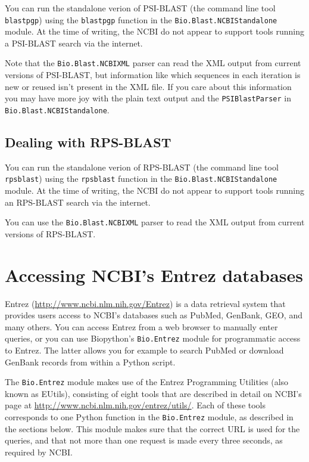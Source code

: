 \documentclass{report}
\begin{document}
You can run the standalone verion of PSI-BLAST (the command line tool
\verb|blastpgp|) using the \verb|blastpgp| function in the
\verb|Bio.Blast.NCBIStandalone| module.
At the time of writing, the NCBI do not appear to support tools running a
PSI-BLAST search via the internet.

Note that the \verb|Bio.Blast.NCBIXML| parser can read the XML output from
current versions of PSI-BLAST, but information like which sequences in each
iteration is new or reused isn't present in the XML file.
If you care about this information you may have more joy with the plain text
output and the \verb|PSIBlastParser| in \verb|Bio.Blast.NCBIStandalone|.

\section{Dealing with RPS-BLAST}

You can run the standalone verion of RPS-BLAST (the command line tool
\verb|rpsblast|) using the \verb|rpsblast| function in the
\verb|Bio.Blast.NCBIStandalone| module.
At the time of writing, the NCBI do not appear to support tools running an
RPS-BLAST search via the internet.

You can use the \verb|Bio.Blast.NCBIXML| parser to read the XML output from
current versions of RPS-BLAST.

\chapter{Accessing NCBI's Entrez databases}
\label{chapter:entrez}

Entrez (\url{http://www.ncbi.nlm.nih.gov/Entrez}) is a data retrieval system that provides users access to NCBI's databases such as PubMed, GenBank, GEO, and many others. You can access Entrez from a web browser to manually enter queries, or you can use Biopython's \verb+Bio.Entrez+ module for programmatic access to Entrez. The latter allows you for example to search PubMed or download GenBank records from within a Python script.

The \verb+Bio.Entrez+ module makes use of the Entrez Programming Utilities (also known as EUtils), consisting of eight tools that are described in detail on NCBI's page at \url{http://www.ncbi.nlm.nih.gov/entrez/utils/}.
Each of these tools corresponds to one Python function in the \verb+Bio.Entrez+ module, as described in the sections below. This module makes sure that the correct URL is used for the queries, and that not more than one request is made every three seconds, as required by NCBI.
\end{document}
